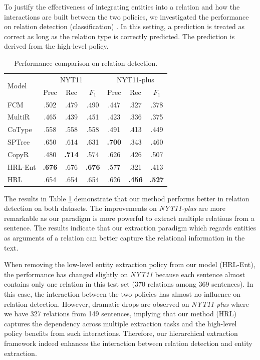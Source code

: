 \documentclass[letterpaper]{article}
\theoremstyle{definition}
\begin{document}
To justify the effectiveness of integrating entities into a relation and how the interactions are built between the two policies, we investigated the performance on relation detection (classification)%
. In this setting, a prediction is treated as correct as long as the relation type is correctly predicted. The prediction is derived from the high-level policy.

\begin{table}[!htb]
    \centering
    \begin{tabular}{lcccccc}
    \toprule
        \multirow{2}{*}{Model} & \multicolumn{3}{c}{NYT11} & \multicolumn{3}{c}{NYT11-plus}\\
         & Prec & Rec & $F_1$ & Prec & Rec & $F_1$ \\
    \midrule
        FCM    & .502 & .479 & .490 & .447 & .327 & .378 \\
        MultiR & .465 & .439 & .451 & .423 & .336 & .375 \\
        CoType & .558 & .558 & .558 & .491 & .413 & .449 \\
        SPTree & .650 & .614 & .631 & \textbf{.700} & .343 & .460 \\
        CopyR & .480 & \textbf{.714} & .574 & .626 & .426 & .507\\
    \midrule
        HRL-Ent  & \textbf{.676} & .676 & \textbf{.676} & .577 & .321 & .413 \\
        HRL    & .654 & .654 & .654 & .626 & \textbf{.456} & \textbf{.527} \\
    \bottomrule
    \end{tabular}
    \caption{Performance comparison on relation detection.} %
    \label{relation}
\end{table}

The results in Table \ref{relation} demonstrate that our method performs better in relation detection on both datasets. The improvements on {\it NYT11-plus} are more remarkable as our paradigm is more powerful to extract multiple relations from a sentence.
The results indicate that our extraction paradigm which regards entities as arguments of a relation can better capture the relational information in the text.

When removing the low-level entity extraction policy from our model (HRL-Ent), the performance has changed slightly on \textit{NYT11} because each sentence almost contains only one relation in this test set (370 relations among 369 sentences).
In this case, the interaction between the two policies has almost no influence on relation detection. However, dramatic drops are observed on \textit{NYT11-plus} where we have 327 relations from 149 sentences, implying that our method (HRL) captures the dependency across multiple extraction tasks and the high-level policy benefits from such interactions. Therefore, our hierarchical extraction framework indeed enhances the interaction between relation detection and entity extraction.
\end{document}
